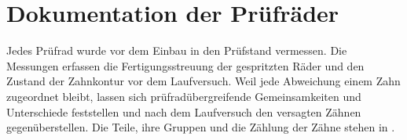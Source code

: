 
\section{Dokumentation der Prüfräder}
\label{sec:dokumentation_pruefraeder}

Jedes Prüfrad wurde vor dem Einbau in den Prüfstand vermessen. Die Messungen erfassen die Fertigungsstreuung der gespritzten Räder und den Zustand der Zahnkontur vor dem Laufversuch. Weil jede Abweichung einem Zahn zugeordnet bleibt, lassen sich prüfradübergreifende Gemeinsamkeiten und Unterschiede feststellen und nach dem Laufversuch den versagten Zähnen gegenüberstellen. Die Teile, ihre Gruppen und die Zählung der Zähne stehen in .

